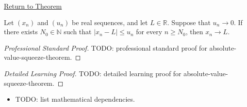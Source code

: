 \newpage
{}
\label{prf:absolute-value-squeeze-theorem}

\begin{remark*}[Return]
\hyperref[thm:absolute-value-squeeze-theorem]{Return to Theorem}
\end{remark*}

\begin{theorem*}
Let $(x_n)$ and $(u_n)$ be real sequences, and let $L\in\mathbb{R}$.
Suppose that $u_n\to 0$. If there exists $N_0\in\mathbb{N}$ such that
$|x_n-L|\le u_n$ for every $n\ge N_0$, then $x_n\to L$.

\smallskip
\noindent
\end{theorem*}

\begin{proof}[Professional Standard Proof]
\LRAProofBodyStart
TODO: professional standard proof for absolute-value-squeeze-theorem.
\end{proof}

\begin{proof}[Detailed Learning Proof]
\LRAProofBodyStart
TODO: detailed learning proof for absolute-value-squeeze-theorem.
\end{proof}

\begin{remark*}
\end{remark*}

\begin{dependencies}
\begin{itemize}
  \item TODO: list mathematical dependencies.
\end{itemize}
\end{dependencies}

\clearpage
